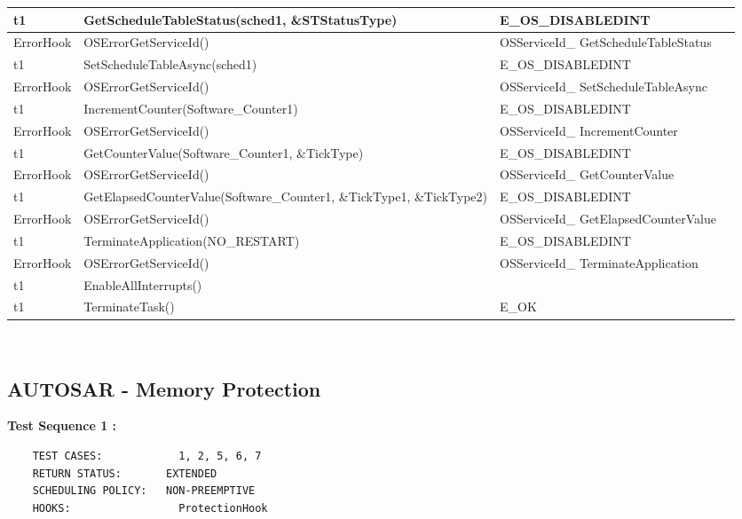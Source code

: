 \documentclass[10pt]{article}
\newlength{\Li}\settowidth{\Li}{Running}
\newlength{\Lii}\setlength{\Lii}{7cm}
\newlength{\Liiii}\setlength{\Liiii}{0.9cm}
\newlength{\Liii}\setlength{\Liii}{\textwidth} \addtolength{\Liii}{-\Li} \addtolength{\Liii}{-\Lii} \addtolength{\Liii}{-\Liiii}
\begin{document}
\begin{supertabular}{|p{\Li}|p{\Lii}|p{\Liii}|p{\Liiii}|}
	t1		& GetScheduleTableStatus(sched1, \&STStatusType)		& E\_OS\_DISABLEDINT					& \\ \hline
	ErrorHook	& OSErrorGetServiceId()								& OSServiceId\_ GetScheduleTableStatus	& \\ \hline
	t1		& SetScheduleTableAsync(sched1)						& E\_OS\_DISABLEDINT					& \\ \hline
	ErrorHook	& OSErrorGetServiceId()								& OSServiceId\_ SetScheduleTableAsync	& \\ \hline
	t1		& IncrementCounter(Software\_Counter1)				& E\_OS\_DISABLEDINT					& \\ \hline
	ErrorHook	& OSErrorGetServiceId()								& OSServiceId\_ IncrementCounter			& \\ \hline
	t1		& GetCounterValue(Software\_Counter1, \&TickType)		& E\_OS\_DISABLEDINT					& \\ \hline
	ErrorHook	& OSErrorGetServiceId()								& OSServiceId\_ GetCounterValue			& \\ \hline
	t1		& GetElapsedCounterValue(Software\_Counter1, \&TickType1, \&TickType2)	& E\_OS\_DISABLEDINT		& \\ \hline
	ErrorHook	& OSErrorGetServiceId()								& OSServiceId\_ GetElapsedCounterValue	& \\ \hline
	t1		& TerminateApplication(NO\_RESTART) 					& E\_OS\_DISABLEDINT					& \\ \hline
	ErrorHook	& OSErrorGetServiceId()								& OSServiceId\_ TerminateApplication		& \\ \hline
	t1		& EnableAllInterrupts()								& 									& \\ \hline
	t1 		& TerminateTask()									& E\_OK								& \\ \hline 
	\end{supertabular}\\
	
	
\subsection{AUTOSAR - Memory Protection}

\settowidth{\Li}{t1\_app\_nontrusted1}
\setlength{\Lii}{\textwidth} \addtolength{\Lii}{-\Li} \addtolength{\Lii}{-\Liii} \addtolength{\Lii}{-\Liiii}

	\textbf{Test Sequence 1 :}
	\begin{lstlisting}
	TEST CASES:		       1, 2, 5, 6, 7
	RETURN STATUS:	  	 EXTENDED
	SCHEDULING POLICY:   NON-PREEMPTIVE
	HOOKS:		           ProtectionHook
	\end{lstlisting}
	
\end{document}
